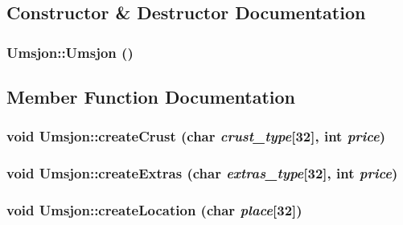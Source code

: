 \subsection{Constructor \& Destructor Documentation}
\hypertarget{class_umsjon_1f89bef332176cd139fa5f900d4735b6}{
\subsubsection[Umsjon]{\setlength{\rightskip}{0pt plus 5cm}Umsjon::Umsjon ()}}
\label{class_umsjon_1f89bef332176cd139fa5f900d4735b6}




\subsection{Member Function Documentation}
\hypertarget{class_umsjon_75c9c243db5456ca368b8cdc6f617603}{
\subsubsection[createCrust]{\setlength{\rightskip}{0pt plus 5cm}void Umsjon::create\-Crust (char {\em crust\_\-type}\mbox{[}32\mbox{]}, int {\em price})}}
\label{class_umsjon_75c9c243db5456ca368b8cdc6f617603}


\hypertarget{class_umsjon_b3b4384d1b6159cee7aab19dc1ff23eb}{
\subsubsection[createExtras]{\setlength{\rightskip}{0pt plus 5cm}void Umsjon::create\-Extras (char {\em extras\_\-type}\mbox{[}32\mbox{]}, int {\em price})}}
\label{class_umsjon_b3b4384d1b6159cee7aab19dc1ff23eb}


\hypertarget{class_umsjon_6827be731c8d50370297264676be442f}{
\subsubsection[createLocation]{\setlength{\rightskip}{0pt plus 5cm}void Umsjon::create\-Location (char {\em place}\mbox{[}32\mbox{]})}}
\label{class_umsjon_6827be731c8d50370297264676be442f}


